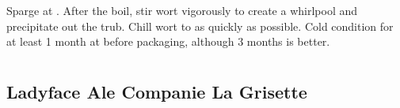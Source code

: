 \documentclass[10pt,oneside]{scrbook}
\begin{document}
\begin{methodandtiming}
 
\begin{mashsteps}
\end{mashsteps}

\begin{fermentationsteps}
\end{fermentationsteps}

\begin{directions}
Sparge at . After the boil, stir wort vigorously to create a
whirlpool and precipitate out the trub. Chill wort to  as quickly
as possible. Cold condition for at least 1 month at  before
packaging, although 3 months is better.
\end{directions}

\end{methodandtiming}

\begin{ingredientsblock}

\begin{malts}
\end{malts}

\begin{hops}
\end{hops}

\begin{yeasts}
\end{yeasts}

\end{ingredientsblock}

\part{\styleaelgianandfrenchale}

\chapter*{Ladyface Ale Companie La Grisette}
\end{document}
